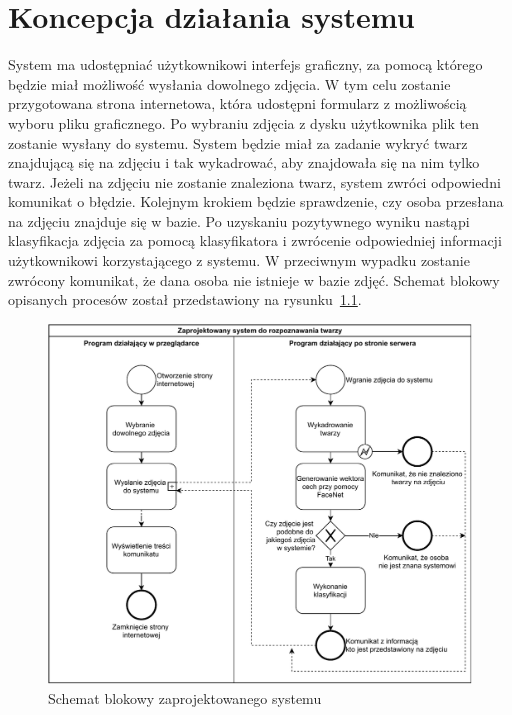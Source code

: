 \chapter{Koncepcja działania systemu}

System ma udostępniać użytkownikowi interfejs graficzny,
za pomocą którego będzie miał możliwość wysłania dowolnego zdjęcia.
W tym celu zostanie przygotowana strona internetowa,
która udostępni formularz z możliwością wyboru pliku graficznego.
Po wybraniu zdjęcia z dysku użytkownika plik ten zostanie wysłany do systemu.
System będzie miał za zadanie wykryć twarz znajdującą się na zdjęciu
i tak wykadrować, aby znajdowała się na nim tylko twarz.
Jeżeli na zdjęciu nie zostanie znaleziona twarz, system zwróci odpowiedni komunikat o błędzie.
Kolejnym krokiem będzie sprawdzenie, czy osoba przesłana na zdjęciu znajduje się w bazie.
Po uzyskaniu pozytywnego wyniku nastąpi klasyfikacja zdjęcia za pomocą klasyfikatora
i zwrócenie odpowiedniej informacji użytkownikowi korzystającego z systemu.
W przeciwnym wypadku zostanie zwrócony komunikat, że dana osoba nie istnieje w bazie zdjęć.
Schemat blokowy opisanych procesów został przedstawiony na rysunku~\ref{fig:schemat_blokowy_systemu}.


\begin{figure}[]
    \centering
    \includegraphics[width=1\textwidth]{images/schemat_blokowy_systemu}
    \caption{Schemat blokowy zaprojektowanego systemu}
    \customsource
    \label{fig:schemat_blokowy_systemu}
\end{figure}